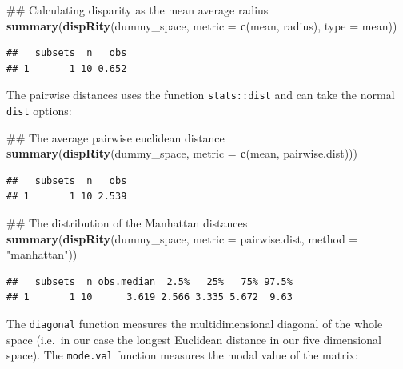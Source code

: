 \documentclass[]{book}
\newenvironment{Shaded}{\begin{snugshade}}{\end{snugshade}}
\newcommand{\KeywordTok}[1]{\textcolor[rgb]{0.13,0.29,0.53}{\textbf{#1}}}
\newcommand{\DataTypeTok}[1]{\textcolor[rgb]{0.13,0.29,0.53}{#1}}
\newcommand{\StringTok}[1]{\textcolor[rgb]{0.31,0.60,0.02}{#1}}
\newcommand{\NormalTok}[1]{#1}
\theoremstyle{definition}
\theoremstyle{definition}
\theoremstyle{remark}
\begin{document}
\begin{Shaded}
\begin{Highlighting}[]
\NormalTok{## Calculating disparity as the mean average radius}
\KeywordTok{summary}\NormalTok{(}\KeywordTok{dispRity}\NormalTok{(dummy_space, }\DataTypeTok{metric =} \KeywordTok{c}\NormalTok{(mean, radius), }\DataTypeTok{type =}\NormalTok{ mean))}
\end{Highlighting}
\end{Shaded}

\begin{verbatim}
##   subsets  n   obs
## 1       1 10 0.652
\end{verbatim}

The pairwise distances uses the function \texttt{stats::dist} and can
take the normal \texttt{dist} options:

\begin{Shaded}
\begin{Highlighting}[]
\NormalTok{## The average pairwise euclidean distance}
\KeywordTok{summary}\NormalTok{(}\KeywordTok{dispRity}\NormalTok{(dummy_space, }\DataTypeTok{metric =} \KeywordTok{c}\NormalTok{(mean, pairwise.dist)))}
\end{Highlighting}
\end{Shaded}

\begin{verbatim}
##   subsets  n   obs
## 1       1 10 2.539
\end{verbatim}

\begin{Shaded}
\begin{Highlighting}[]
\NormalTok{## The distribution of the Manhattan distances}
\KeywordTok{summary}\NormalTok{(}\KeywordTok{dispRity}\NormalTok{(dummy_space, }\DataTypeTok{metric =}\NormalTok{ pairwise.dist, }\DataTypeTok{method =} \StringTok{"manhattan"}\NormalTok{))}
\end{Highlighting}
\end{Shaded}

\begin{verbatim}
##   subsets  n obs.median  2.5%   25%   75% 97.5%
## 1       1 10      3.619 2.566 3.335 5.672  9.63
\end{verbatim}

The \texttt{diagonal} function measures the multidimensional diagonal of
the whole space (i.e.~in our case the longest Euclidean distance in our
five dimensional space). The \texttt{mode.val} function measures the
modal value of the matrix:
\end{document}
